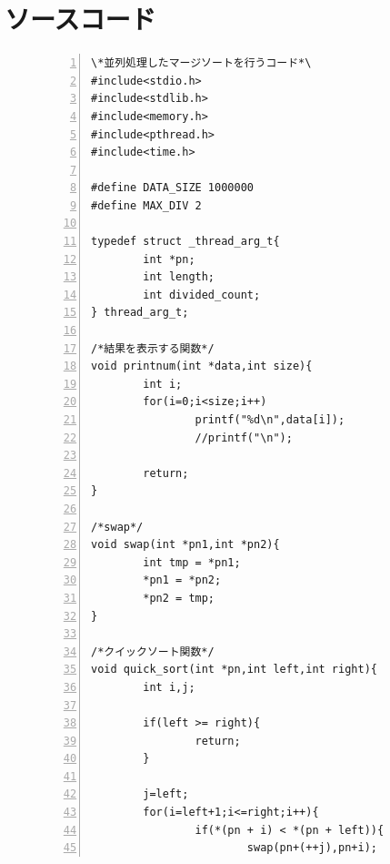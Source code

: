 \documentclass[11pt,a4paper]{jsarticle}
\begin{document}
\newpage
\section*{ソースコード}
\begin{figure}[htbp]
 \begin{center}
  \begin{Verbatim}[frame=single,baselinestretch=1,fontsize=\footnotesize,numbers=left]
\*並列処理したマージソートを行うコード*\
#include<stdio.h>
#include<stdlib.h>
#include<memory.h>
#include<pthread.h>
#include<time.h>

#define DATA_SIZE 1000000
#define MAX_DIV 2

typedef struct _thread_arg_t{
		int *pn;
		int length;
		int divided_count;
} thread_arg_t;

/*結果を表示する関数*/
void printnum(int *data,int size){
		int i;
		for(i=0;i<size;i++)
				printf("%d\n",data[i]);
				//printf("\n");

		return;
}

/*swap*/
void swap(int *pn1,int *pn2){
		int tmp = *pn1;
		*pn1 = *pn2;
		*pn2 = tmp;
}

/*クイックソート関数*/
void quick_sort(int *pn,int left,int right){
		int i,j;

		if(left >= right){
				return;
		}

		j=left;
		for(i=left+1;i<=right;i++){
				if(*(pn + i) < *(pn + left)){
						swap(pn+(++j),pn+i);
  \end{Verbatim}
 \end{center}
\end{figure}
\end{document}
